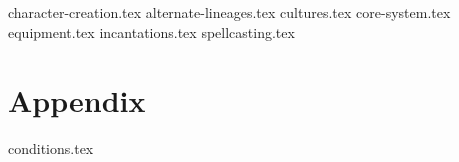 \documentclass[10pt,twoside,twocolumn,openany]{dndbook}
\begin{document}
{character-creation.tex}
{alternate-lineages.tex}
{cultures.tex}
{core-system.tex}
{equipment.tex}
{incantations.tex}
{spellcasting.tex}
\chapter{Appendix}\label{ch:appendix}
{conditions.tex}
\end{document}
